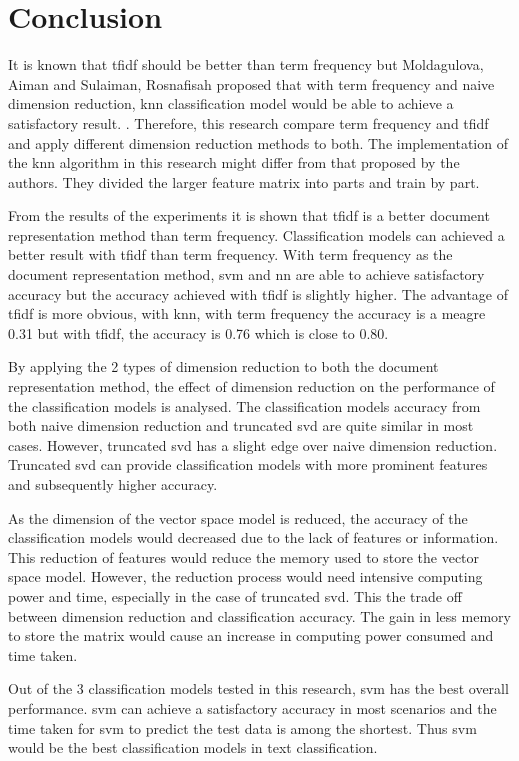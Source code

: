 \chapter{Conclusion}
It is known that \ac{tfidf} should be better than term frequency but Moldagulova, Aiman and Sulaiman, Rosnafisah proposed that with term frequency and naive dimension reduction, \ac{knn} classification model would be able to achieve a satisfactory result. \cite{knnVectorSpaceReduction}. Therefore, this research compare term frequency and \ac{tfidf} and apply different dimension reduction methods to both. The implementation of the \ac{knn} algorithm in this research might differ from that proposed by the authors. They divided the larger feature matrix into parts and train by part.

From the results of the experiments it is shown that \ac{tfidf} is a better document representation method than term frequency. Classification models can achieved a better result with \ac{tfidf} than term frequency. With term frequency as the document representation method, \ac{svm} and \ac{nn} are able to achieve satisfactory accuracy but the accuracy achieved with \ac{tfidf} is slightly higher. The advantage of \ac{tfidf} is more obvious, with \ac{knn}, with term frequency the accuracy is a meagre 0.31 but with \ac{tfidf}, the accuracy is 0.76 which is close to 0.80.

By applying the 2 types of dimension reduction to both the document representation method, the effect of dimension reduction on the performance of the classification models is analysed. The classification models accuracy from both naive dimension reduction and truncated \ac{svd} are quite similar in most cases. However, truncated \ac{svd} has a slight edge over naive dimension reduction. Truncated \ac{svd} can provide classification models with more prominent features and subsequently higher accuracy.

As the dimension of the vector space model is reduced, the accuracy of the classification models would decreased due to the lack of features or information. This reduction of features would reduce the memory used to store the vector space model. However, the reduction process would need intensive computing power and time, especially in the case of truncated \ac{svd}. This the trade off between dimension reduction and classification accuracy. The gain in less memory to store the matrix would cause an increase in computing power consumed and time taken.

Out of the 3 classification models tested in this research, \ac{svm} has the best overall performance. \Ac{svm} can achieve a satisfactory accuracy in most scenarios and the time taken for \ac{svm} to predict the test data is among the shortest. Thus \ac{svm} would be the best classification models in text classification.

